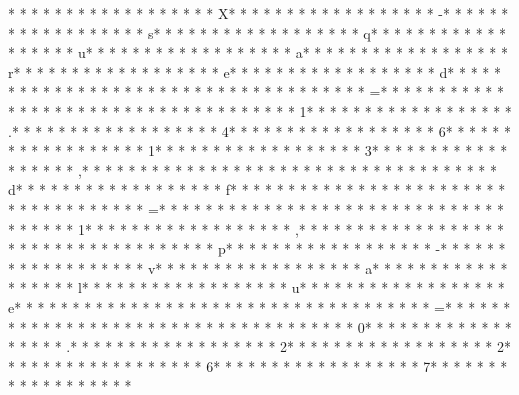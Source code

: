 * * *  * * *  * * *  *  * * *  *  * * *  * X* * *  * * *  * * *  *  * * *  *  * * *  * -* * *  * * *  * * *  *  * * *  *  * * *  * s* * *  * * *  * * *  *  * * *  *  * * *  * q* * *  * * *  * * *  *  * * *  *  * * *  * u* * *  * * *  * * *  *  * * *  *  * * *  * a* * *  * * *  * * *  *  * * *  *  * * *  * r* * *  * * *  * * *  *  * * *  *  * * *  * e* * *  * * *  * * *  *  * * *  *  * * *  * d* * *  * * *  * * *  *  * * *  *  * * *  *  * * *  * * *  * * *  *  * * *  *  * * *  * =* * *  * * *  * * *  *  * * *  *  * * *  *  * * *  * * *  * * *  *  * * *  *  * * *  * 1* * *  * * *  * * *  *  * * *  *  * * *  * .* * *  * * *  * * *  *  * * *  *  * * *  * 4* * *  * * *  * * *  *  * * *  *  * * *  * 6* * *  * * *  * * *  *  * * *  *  * * *  * 1* * *  * * *  * * *  *  * * *  *  * * *  * 3* * *  * * *  * * *  *  * * *  *  * * *  * ,* * *  * * *  * * *  *  * * *  *  * * *  *  * * *  * * *  * * *  *  * * *  *  * * *  * d* * *  * * *  * * *  *  * * *  *  * * *  * f* * *  * * *  * * *  *  * * *  *  * * *  *  * * *  * * *  * * *  *  * * *  *  * * *  * =* * *  * * *  * * *  *  * * *  *  * * *  *  * * *  * * *  * * *  *  * * *  *  * * *  * 1* * *  * * *  * * *  *  * * *  *  * * *  * ,* * *  * * *  * * *  *  * * *  *  * * *  *  * * *  * * *  * * *  *  * * *  *  * * *  * p* * *  * * *  * * *  *  * * *  *  * * *  * -* * *  * * *  * * *  *  * * *  *  * * *  * v* * *  * * *  * * *  *  * * *  *  * * *  * a* * *  * * *  * * *  *  * * *  *  * * *  * l* * *  * * *  * * *  *  * * *  *  * * *  * u* * *  * * *  * * *  *  * * *  *  * * *  * e* * *  * * *  * * *  *  * * *  *  * * *  *  * * *  * * *  * * *  *  * * *  *  * * *  * =* * *  * * *  * * *  *  * * *  *  * * *  *  * * *  * * *  * * *  *  * * *  *  * * *  * 0* * *  * * *  * * *  *  * * *  *  * * *  * .* * *  * * *  * * *  *  * * *  *  * * *  * 2* * *  * * *  * * *  *  * * *  *  * * *  * 2* * *  * * *  * * *  *  * * *  *  * * *  * 6* * *  * * *  * * *  *  * * *  *  * * *  * 7* * *  * * *  * * *  *  * * *  *  * * *  * 
